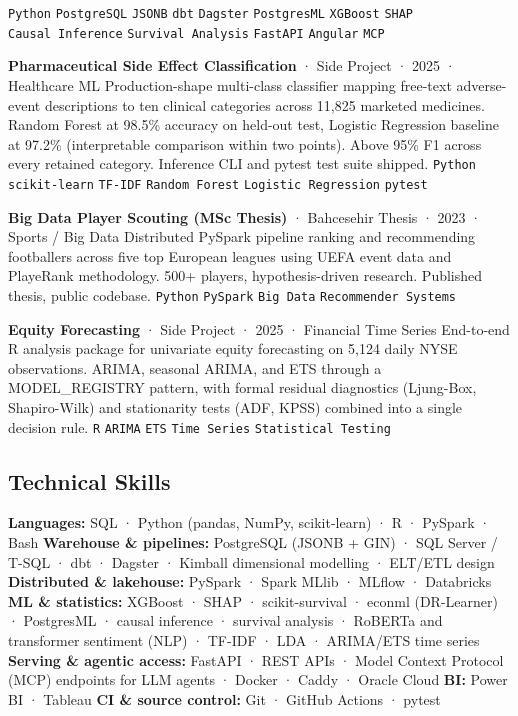 \documentclass[
  10pt,
]{article}
\begin{document}
\texttt{Python} \texttt{PostgreSQL} \texttt{JSONB} \texttt{dbt}
\texttt{Dagster} \texttt{PostgresML} \texttt{XGBoost} \texttt{SHAP}
\texttt{Causal\ Inference} \texttt{Survival\ Analysis} \texttt{FastAPI}
\texttt{Angular} \texttt{MCP}

\textbf{Pharmaceutical Side Effect Classification} · Side Project · 2025
· Healthcare ML Production-shape multi-class classifier mapping
free-text adverse-event descriptions to ten clinical categories across
11,825 marketed medicines. Random Forest at 98.5\% accuracy on held-out
test, Logistic Regression baseline at 97.2\% (interpretable comparison
within two points). Above 95\% F1 across every retained category.
Inference CLI and pytest test suite shipped. \texttt{Python}
\texttt{scikit-learn} \texttt{TF-IDF} \texttt{Random\ Forest}
\texttt{Logistic\ Regression} \texttt{pytest}

\textbf{Big Data Player Scouting (MSc Thesis)} · Bahcesehir Thesis ·
2023 · Sports / Big Data Distributed PySpark pipeline ranking and
recommending footballers across five top European leagues using UEFA
event data and PlayeRank methodology. 500+ players, hypothesis-driven
research. Published thesis, public codebase. \texttt{Python}
\texttt{PySpark} \texttt{Big\ Data} \texttt{Recommender\ Systems}

\textbf{Equity Forecasting} · Side Project · 2025 · Financial Time
Series End-to-end R analysis package for univariate equity forecasting
on 5,124 daily NYSE observations. ARIMA, seasonal ARIMA, and ETS through
a MODEL\_REGISTRY pattern, with formal residual diagnostics (Ljung-Box,
Shapiro-Wilk) and stationarity tests (ADF, KPSS) combined into a single
decision rule. \texttt{R} \texttt{ARIMA} \texttt{ETS}
\texttt{Time\ Series} \texttt{Statistical\ Testing}

\subsection{Technical Skills}\label{technical-skills}

\textbf{Languages:} SQL · Python (pandas, NumPy, scikit-learn) · R ·
PySpark · Bash \textbf{Warehouse \& pipelines:} PostgreSQL (JSONB + GIN)
· SQL Server / T-SQL · dbt · Dagster · Kimball dimensional modelling ·
ELT/ETL design \textbf{Distributed \& lakehouse:} PySpark · Spark MLlib
· MLflow · Databricks \textbf{ML \& statistics:} XGBoost · SHAP ·
scikit-survival · econml (DR-Learner) · PostgresML · causal inference ·
survival analysis · RoBERTa and transformer sentiment (NLP) · TF-IDF ·
LDA · ARIMA/ETS time series \textbf{Serving \& agentic access:} FastAPI
· REST APIs · Model Context Protocol (MCP) endpoints for LLM agents ·
Docker · Caddy · Oracle Cloud \textbf{BI:} Power BI · Tableau \textbf{CI
\& source control:} Git · GitHub Actions · pytest
\end{document}
